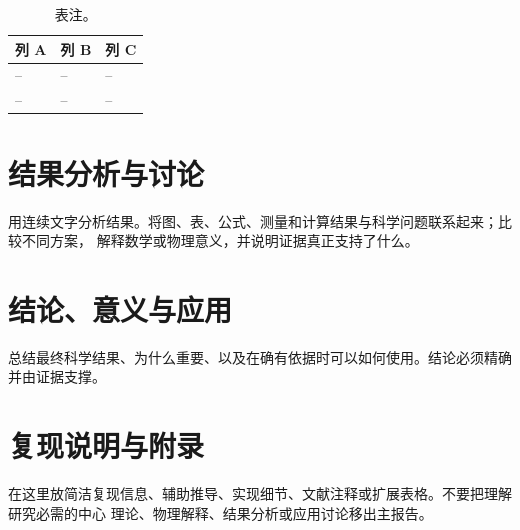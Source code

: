 \documentclass[11pt,a4paper,fontset=fandol]{ctexart}
\newif\ifResearchHasCitations
\begin{document}
\begin{table}[htbp]
\caption{表注。}
\label{tab:report-example-zh}
\begin{tabularx}{\textwidth}{YYY}
\toprule
列 A & 列 B & 列 C \\
\midrule
-- & -- & -- \\
-- & -- & -- \\
\bottomrule
\end{tabularx}
\end{table}

\section{结果分析与讨论}

用连续文字分析结果。将图、表、公式、测量和计算结果与科学问题联系起来；比较不同方案，
解释数学或物理意义，并说明证据真正支持了什么。

\section{结论、意义与应用}

总结最终科学结果、为什么重要、以及在确有依据时可以如何使用。结论必须精确并由证据支撑。

\appendix
\section{复现说明与附录}

在这里放简洁复现信息、辅助推导、实现细节、文献注释或扩展表格。不要把理解研究必需的中心
理论、物理解释、结果分析或应用讨论移出主报告。


\ifResearchHasCitations
  \IfFileExists{refs.bib}{%
    
    }{}
\fi
\end{document}
